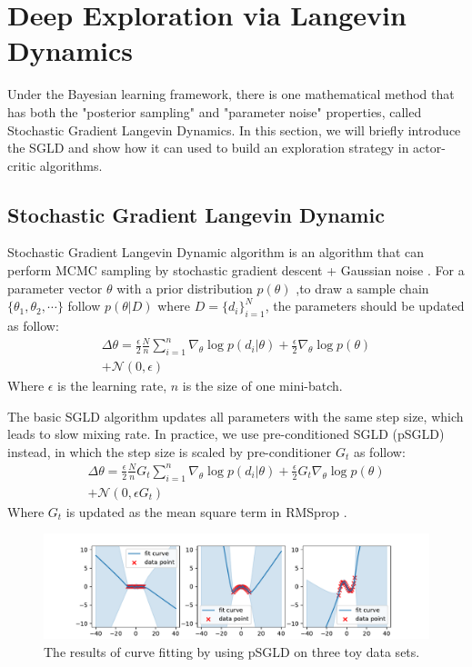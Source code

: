 \section{Deep Exploration via Langevin Dynamics}
Under the Bayesian learning framework, there is one mathematical method that has both the "posterior sampling" and "parameter noise" properties, called Stochastic Gradient Langevin Dynamics. In this section, we will briefly introduce the SGLD and show how it can used to build an exploration strategy in actor-critic algorithms.

\subsection{Stochastic Gradient Langevin Dynamic}
Stochastic Gradient Langevin Dynamic algorithm is an algorithm that can perform MCMC sampling by stochastic gradient descent + Gaussian noise \cite{SGLD}. For a parameter vector $\theta$ with a prior distribution $p(\theta)$ ,to draw a sample chain $\{\theta_1,\theta_2,\cdots\}$ follow $p(\theta|D)$ where $D=\{d_i\}^N_{i=1}$, the parameters should be updated as follow:
\begin{equation}
   \label{eq:sgld} 
   \begin{aligned}
\Delta\theta =\frac{\epsilon}{2}\frac{N}{n}\sum_{i=1}^{n}\nabla_\theta\log p(d_i|\theta)+\frac{\epsilon}{2}\nabla_\theta\log p(\theta)\\
+\mathcal{N}(0,\epsilon)
\end{aligned}
\end{equation}
Where $\epsilon$ is the learning rate, $n$ is the size of one mini-batch. 

The basic SGLD algorithm updates all parameters with the same step size, which leads to slow mixing rate. In practice, we use pre-conditioned SGLD (pSGLD) instead, in which the step size is scaled by pre-conditioner $G_t$ as follow:
\begin{equation}
   \label{eq:psgld} 
   \begin{aligned}
      \Delta\theta =\frac{\epsilon}{2}\frac{N}{n}G_t\sum_{i=1}^{n}\nabla_\theta\log p(d_i|\theta)+\frac{\epsilon}{2}G_t\nabla_\theta\log p(\theta)\\
      +\mathcal{N}(0,\epsilon G_t)
   \end{aligned}
\end{equation}
Where $G_t$ is updated as the mean square term in RMSprop \cite{rmsprop}.
\begin{figure}[htbp]
   \begin{center}
      \centerline{\includegraphics[width=400pt]{figs/three-curve}}
   \caption{The results of curve fitting by using pSGLD on three toy data sets.}
   \label{fig:three}
   \end{center}
\end{figure}

